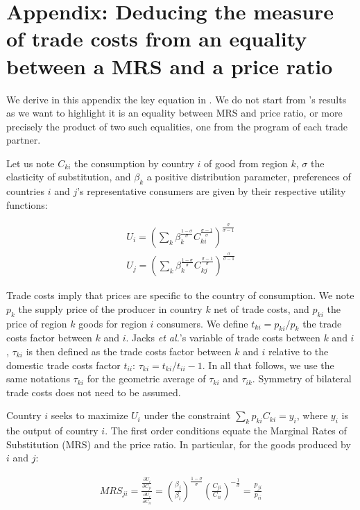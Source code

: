 \documentclass{article}
\begin{document}
\appendix

\section{\label{A1}Appendix: Deducing the measure of trade costs from an equality between a MRS and a price ratio}

We derive in this appendix the key equation in \cite{JMN2011}.
We do not start from \cite{AW2003}'s results as we want to
highlight it is an equality between MRS and price ratio, or
more precisely the product of two such equalities, one from the
program of each trade partner.

Let us note $C_{ki}$ the consumption by country $i$ of good from
region $k$, $\sigma$ the elasticity of substitution, and
$\beta_k$ a positive distribution parameter, preferences of
countries $i$ and $j$'s representative consumers are given by
their respective utility functions:

\begin{eqnarray*}
U_i=\left(\sum_k\beta_{k}^{\frac{1-\sigma}{\sigma}}C_{ki}^{\frac{\sigma-1}{\sigma}}\right)^{\frac{\sigma}{\sigma-1}}\\
U_j=\left(\sum_k\beta_{k}^{\frac{1-\sigma}{\sigma}}C_{kj}^{\frac{\sigma-1}{\sigma}}\right)^{\frac{\sigma}{\sigma-1}}
\end{eqnarray*}

Trade costs imply that prices are specific to the country of
consumption. We note $p_k$ the supply price of the producer in
country $k$ net of trade costs, and $p_{ki}$ the price of
region $k$ goods for region $i$ consumers. We define
$t_{ki}=p_{ki}/p_{k}$ the trade costs factor between $k$ and
$i$. Jacks \textit{et al.}'s variable of trade costs between $k$ and
$i$, $\tau_{ki}$ is then defined as the trade costs factor
between $k$ and $i$ relative to the domestic trade costs factor
$t_{ii}$: $\tau_{ki}=t_{ki}/t_{ii}-1$. In all that follows, we
use the same notations $\tau_{ki}$ for the geometric average of
$\tau_{ki}$ and $\tau_{ik}$. Symmetry of bilateral trade costs
does not need to be assumed.

Country $i$ seeks to maximize $U_i$ under the constraint
$\sum_k p_{ki} C_{ki}=y_i$, where $y_i$ is the output of
country $i$. The first order conditions equate the Marginal
Rates of Substitution (MRS) and the price ratio. In particular,
for the goods produced by $i$ and $j$:

\begin{eqnarray*}
MRS_{ji}=\frac{\frac{\partial U_i}{\partial C_{ji}}}{\frac{\partial
U_i}{\partial C_{ii}}}=
\left(\frac{\beta_j}{\beta_i}\right)^{\frac{1-\sigma}{\sigma}}\left(\frac{C_{ji}}{C_{ii}}\right)^{-\frac{1}{\sigma}}=\frac{p_{ji}}{p_{ii}}
\end{eqnarray*}
\end{document}
